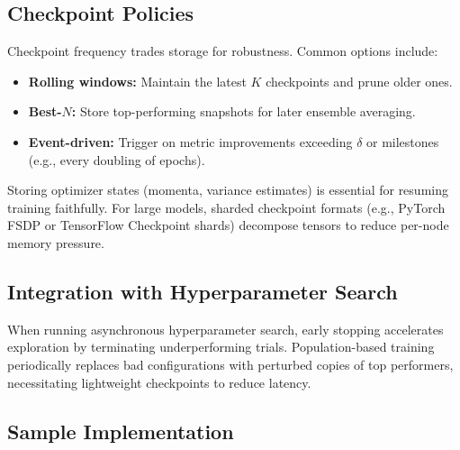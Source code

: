 \documentclass{article}
\begin{document}
\subsection{Checkpoint Policies}
Checkpoint frequency trades storage for robustness. Common options include:
\begin{itemize}
  \item \textbf{Rolling windows:} Maintain the latest $K$ checkpoints and prune older ones.
  \item \textbf{Best-$N$:} Store top-performing snapshots for later ensemble averaging.
  \item \textbf{Event-driven:} Trigger on metric improvements exceeding $\delta$ or milestones (e.g., every doubling of epochs).
\end{itemize}
Storing optimizer states (momenta, variance estimates) is essential for resuming training faithfully. For large models, sharded checkpoint formats (e.g., PyTorch FSDP or TensorFlow Checkpoint shards) decompose tensors to reduce per-node memory pressure.

\subsection{Integration with Hyperparameter Search}
When running asynchronous hyperparameter search, early stopping accelerates exploration by terminating underperforming trials. Population-based training periodically replaces bad configurations with perturbed copies of top performers, necessitating lightweight checkpoints to reduce latency.

\subsection{Sample Implementation}
\end{document}
